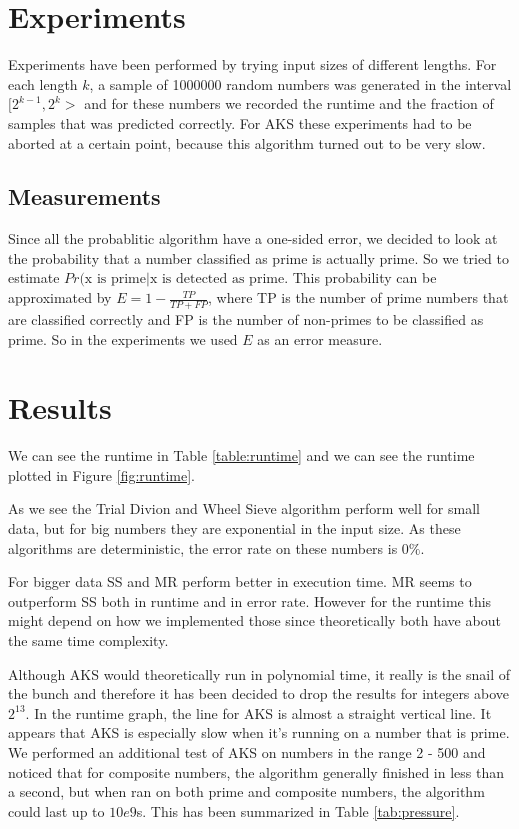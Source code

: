 
\section{Experiments}
\label{sec:experiments}

Experiments have been performed by trying input sizes of different lengths.
For each length $k$, a sample of 1000000 random numbers was generated in the interval $[2^{k-1}, 2^k>$ and for these numbers we recorded the runtime and the fraction of samples that was predicted correctly.
    For AKS these experiments had to be aborted at a certain point, because this algorithm turned out to be very slow.

\subsection{Measurements}
Since all the probablitic algorithm have a one-sided error, we decided to look at the probability that a number classified as prime is actually prime.
So we tried to estimate $Pr(\text{x is prime} | \text{x is detected as prime}$.
This probability can be approximated by $E = 1 - \frac{TP}{TP + FP}$, where TP is the number of prime numbers that are classified correctly and FP is the number of non-primes to be classified as prime.
So in the experiments we used $E$ as an error measure.

\section{Results}
\label{sec:results}

We can see the runtime in Table \ref{table:runtime} and we can see the runtime plotted in Figure \ref{fig:runtime}.

As we see the Trial Divion and Wheel Sieve algorithm perform well for small data, but for big numbers they are exponential in the input size.
As these algorithms are deterministic, the error rate on these numbers is $0\%$.

For bigger data SS and MR perform better in execution time.
MR seems to outperform SS both in runtime and in error rate.
However for the runtime this might depend on how we implemented those since theoretically both have about the same time complexity.

Although AKS would theoretically run in polynomial time, it really is the snail of the bunch and therefore it has been decided to drop the results for integers above $2^{13}$.
In the runtime graph, the line for AKS is almost a straight vertical line.
It appears that AKS is especially slow when it's running on a number that is prime.
We performed an additional test of AKS on numbers in the range 2 - 500 and noticed that for composite numbers, the algorithm generally finished in less than a second, but when ran on both prime and composite numbers, the algorithm could last up to $10e9$s.
This has been summarized in Table \ref{tab:pressure}.


